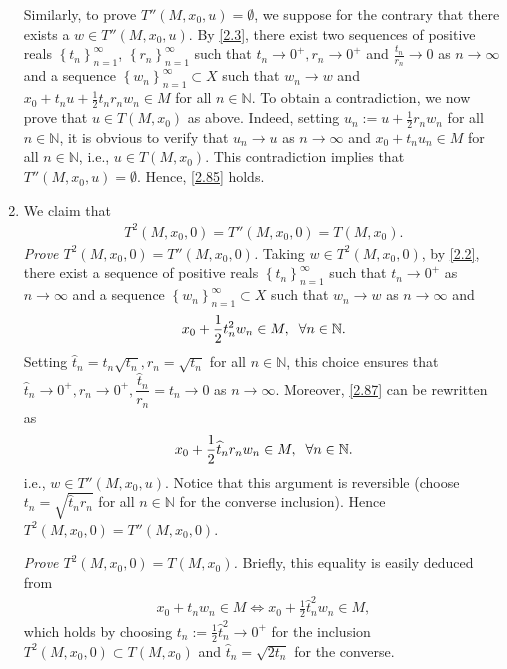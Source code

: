 \documentclass[a4paper]{article}
\numberwithin{equation}{section}
\begin{document}
\begin{enumerate}
Similarly, to prove $T''\left(M,x_0,u\right) =\emptyset$, we suppose for the contrary that there exists a $w\in T''\left(M,x_0,u\right)$. By \eqref{2.3}, there exist two sequences of positive reals $\left\{ {{t_n}} \right\}_{n = 1}^\infty $, $\left\{ {{r_n}} \right\}_{n = 1}^\infty $ such that $t_n\to 0^+,r_n\to 0^+$ and $\frac{t_n}{r_n}\to 0$ as $n\to \infty$ and a sequence $\left\{ {{w_n}} \right\}_{n = 1}^\infty  \subset X$ such that $w_n\to w$ and $x_0+t_n u+\frac{1}{2}t_nr_nw_n\in M$ for all $n\in \mathbb{N}$. To obtain a contradiction, we now prove that $u\in T\left(M,x_0\right)$ as above. Indeed, setting $u_n:=u+\frac{1}{2}r_nw_n$ for all $n\in \mathbb{N}$, it is obvious to verify that $u_n\to u$ as $n\to \infty$ and $x_0+t_nu_n\in M$ for all $n\in \mathbb{N}$, i.e., $u\in T\left(M,x_0\right)$. This contradiction implies that $T''\left(M,x_0,u\right)=\emptyset$. Hence, \eqref{2.85} holds.
\item We claim that
\begin{align}
{T^2}\left( {M,{x_0},0} \right) = T''\left( {M,{x_0},0} \right) = T\left( {M,{x_0}} \right).
\end{align}
\textit{Prove ${T^2}\left( {M,{x_0},0} \right) = T''\left( {M,{x_0},0} \right)$.} Taking $w\in T^2\left(M,x_0,0\right)$, by \eqref{2.2}, there exist a sequence of positive reals $\left\{ {{t_n}} \right\}_{n = 1}^\infty $ such that $t_n\to 0^+$ as $n\to \infty$ and a sequence $\left\{ {{w_n}} \right\}_{n = 1}^\infty  \subset X$ such that $w_n\to w$ as $n\to \infty$ and 
\begin{align}
\label{2.87}
{x_0} + \frac{1}{2}t_n^2{w_n} \in M,\hspace{0.2cm}\forall n \in \mathbb{N}.
\end{align}
Setting ${\widehat t_n} = {t_n}\sqrt {{t_n}} ,{r_n} = \sqrt {{t_n}} $ for all $n\in \mathbb{N}$, this choice ensures that $\widehat{t}_n\to 0^+,r_n\to 0^+,\dfrac{\widehat{t}_n}{r_n}=t_n\to 0$ as $n\to \infty$. Moreover, \eqref{2.87} can be rewritten as
\begin{align}
{x_0} + \frac{1}{2}{\widehat t_n}{r_n}{w_n} \in M,\hspace{0.2cm}\forall n \in \mathbb{N}.
\end{align}
i.e., $w\in T''\left(M,x_0,u\right)$. Notice that this argument is reversible (choose ${t_n} = \sqrt {{{\widehat t}_n}{r_n}} $ for all $n\in \mathbb{N}$ for the converse inclusion). Hence ${T^2}\left( {M,{x_0},0} \right) = T''\left( {M,{x_0},0} \right)$.

\textit{Prove ${T^2}\left( {M,{x_0},0} \right) = T\left( {M,{x_0}} \right)$.} Briefly, this equality is easily deduced from
\begin{align}
{x_0} + {t_n}{w_n} \in M \Leftrightarrow {x_0} + \frac{1}{2}\widehat t_n^2{w_n} \in M,
\end{align}
which holds by choosing ${t_n} := \frac{1}{2}\widehat t_n^2 \to {0^ + }$ for the inclusion ${T^2}\left( {M,{x_0},0} \right) \subset T\left( {M,{x_0}} \right)$ and ${\widehat t_n} = \sqrt {2{t_n}} $ for the converse.


\end{enumerate}
\end{document}
